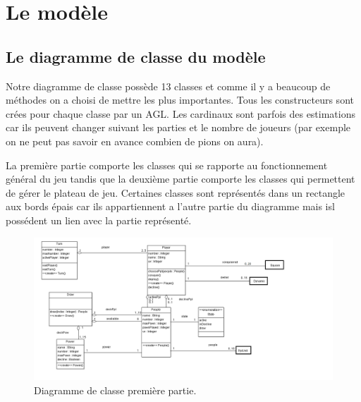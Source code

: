 \documentclass[11pt]{report}
\begin{document}
	

\chapter{Le modèle}

	\section{Le diagramme de classe du modèle}
	
	Notre diagramme de classe possède 13 classes et comme il y a beaucoup de méthodes on a choisi de mettre les plus importantes. Tous les constructeurs sont crées pour chaque classe par un AGL. Les cardinaux sont parfois des estimations car ils peuvent changer suivant les parties et le nombre de joueurs (par exemple on ne peut pas savoir en avance combien de pions on aura). 
	
	La première partie comporte les classes qui se rapporte au fonctionnement général du jeu tandis que la deuxième partie comporte les classes qui permettent de gérer le plateau de jeu.
Certaines classes sont représentés dans un rectangle aux bords épais car ils appartiennent a l'autre partie du diagramme mais isl possédent un lien avec la partie représenté.

					\begin{figure}[!h]
\centering
\includegraphics[width=15cm]{Game.png}
\caption{Diagramme de classe première partie.}
\end{figure}
\end{document}
